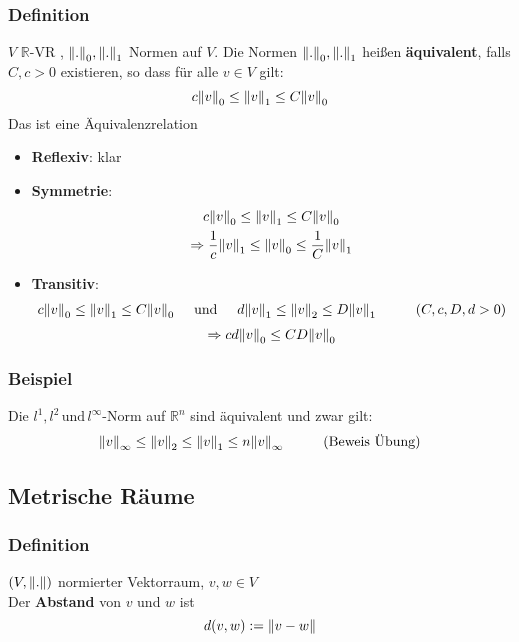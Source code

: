 \subsubsection{Definition} %
\label{ssub:definition}
$ V$ $\mathbb{R}$-VR , $\norm{.}_0 , \norm{.}_1$ Normen auf $ V$. Die Normen $\norm{.}_0 , \norm{.}_1$ heißen {\bfseries äquivalent}, falls $C,c>0$ existieren, so dass für alle $v \in  V$ gilt:
\[
	c \norm{v}_0 \leq \norm{v}_1 \leq C \norm{v}_0 
\] 
 Das ist eine Äquivalenzrelation
\begin{itemize}
	\item {\bfseries Reflexiv}: klar
	\item {\bfseries Symmetrie}: \begin{gather*}
		c \norm{v}_0 \leq \norm{v}_1 \leq C \norm{v}_0 \\
		\Rightarrow \frac{1}{c} \norm{v}_1 \leq \norm{v}_0 \leq \frac{1}{C} \norm{v}_1
	\end{gather*}
	\item {\bfseries Transitiv}: \begin{gather*}
		c \norm{v}_0 \leq \norm{v}_1 \leq C \norm{v}_0 \hspace{0.5cm} \text{und}\hspace{0.5cm} d \norm{v}_1 \leq \norm{v}_2 \leq D \norm{v}_1  \hspace{1cm} (C,c,D,d > 0)	\end{gather*}
		\[
		\Rightarrow cd \norm{v}_0 \leq CD \norm{v}_0
		\]
\end{itemize}

\subsubsection{Beispiel} %
\label{ssub:beispiel}
Die $l^1, l^2 \, \text{und} \, l^{\infty}$-Norm auf $\mathbb{R}^n $ sind äquivalent und zwar gilt:
\[
	\norm{v}_{\infty} \leq \norm{v}_2 \leq \norm{v}_1 \leq n \norm{v}_{\infty} \hspace{1cm} \text{(Beweis Übung)}
\]

\subsection{Metrische Räume} %
\label{sub:metrische_raume}

\subsubsection{Definition} %
\label{ssub:definition}
$(V,\norm{.})$ normierter Vektorraum, $v,w \in  V$ \\
Der {\bfseries Abstand} von $v$ und $w$ ist \[
d(v,w):= \norm{v-w}	
\] 
